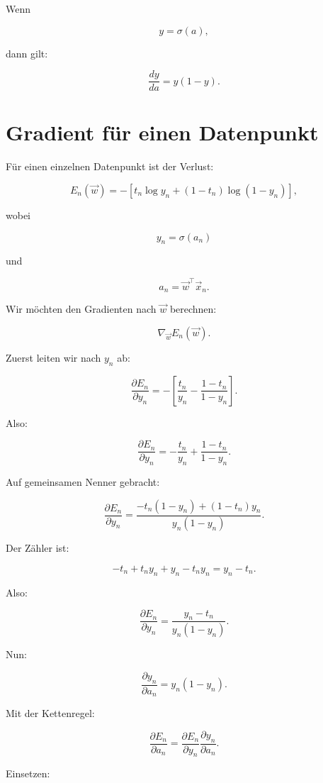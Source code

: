 Wenn

\[
    y=\sigma(a),
\]

dann gilt:

\[
    \frac{dy}{da}
    =
    y(1-y).
\]

\section{Gradient für einen Datenpunkt}

Für einen einzelnen Datenpunkt ist der Verlust:

\[
    E_n(\vec{w})
    =
    -\left[
        t_n\log y_n
        +
        (1-t_n)\log(1-y_n)
    \right],
\]

wobei

\[
    y_n
    =
    \sigma(a_n)
\]

und

\[
    a_n
    =
    \vec{w}^{\top}\vec{x}_n.
\]

Wir möchten den Gradienten nach \(\vec{w}\) berechnen:

\[
    \nabla_{\vec{w}}E_n(\vec{w}).
\]

Zuerst leiten wir nach \(y_n\) ab:

\[
    \frac{\partial E_n}{\partial y_n}
    =
    -\left[
        \frac{t_n}{y_n}
        -
        \frac{1-t_n}{1-y_n}
    \right].
\]

Also:

\[
    \frac{\partial E_n}{\partial y_n}
    =
    -\frac{t_n}{y_n}
    +
    \frac{1-t_n}{1-y_n}.
\]

Auf gemeinsamen Nenner gebracht:

\[
    \frac{\partial E_n}{\partial y_n}
    =
    \frac{
        -t_n(1-y_n)
        +
        (1-t_n)y_n
    }{
        y_n(1-y_n)
    }.
\]

Der Zähler ist:

\[
    -t_n+t_ny_n+y_n-t_ny_n
    =
    y_n-t_n.
\]

Also:

\[
    \frac{\partial E_n}{\partial y_n}
    =
    \frac{y_n-t_n}{y_n(1-y_n)}.
\]

Nun:

\[
    \frac{\partial y_n}{\partial a_n}
    =
    y_n(1-y_n).
\]

Mit der Kettenregel:

\[
    \frac{\partial E_n}{\partial a_n}
    =
    \frac{\partial E_n}{\partial y_n}
    \frac{\partial y_n}{\partial a_n}.
\]

Einsetzen:

